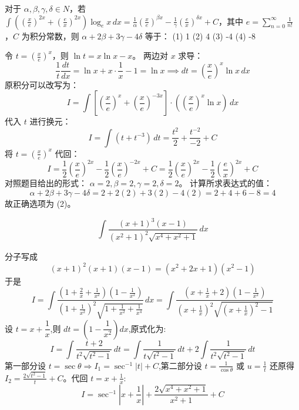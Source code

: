 \begin{questions}
    \question
对于 $\alpha, \beta, \gamma, \delta \in N$，若 $\int \left( \left(\frac{x}{e}\right)^{2x} + \left(\frac{e}{x}\right)^{2x} \right) \log_e x \,dx = \frac{1}{\alpha} \left(\frac{x}{e}\right)^{\beta x} - \frac{1}{\gamma} \left(\frac{e}{x}\right)^{\delta x} + C$，其中 $e = \sum_{n=0}^{\infty} \frac{1}{n!}$，$C$ 为积分常数，则 $\alpha + 2\beta + 3\gamma - 4\delta$ 等于：
(1) 1 \quad (2) 4 \quad (3) -4 \quad (4) -8

\begin{solution}
令 $t = \left(\frac{x}{e}\right)^x$，则 $\ln t = x \ln x - x$。
两边对 $x$ 求导：
\[
\frac{1}{t} \frac{dt}{dx} = \ln x + x \cdot \frac{1}{x} - 1 = \ln x \implies dt = \left(\frac{x}{e}\right)^x \ln x \,dx
\]
原积分可以改写为：
\[
I = \int \left[ \left(\frac{x}{e}\right)^x + \left(\frac{x}{e}\right)^{-3x} \right] \cdot \left( \left(\frac{x}{e}\right)^x \ln x \right) \,dx
\]
代入 $t$ 进行换元：
\[
I = \int (t + t^{-3}) \,dt = \frac{t^2}{2} + \frac{t^{-2}}{-2} + C
\]
将 $t = \left(\frac{x}{e}\right)^x$ 代回：
\[
I = \frac{1}{2} \left(\frac{x}{e}\right)^{2x} - \frac{1}{2} \left(\frac{x}{e}\right)^{-2x} + C = \frac{1}{2} \left(\frac{x}{e}\right)^{2x} - \frac{1}{2} \left(\frac{e}{x}\right)^{2x} + C
\]
对照题目给出的形式：
$\alpha = 2, \beta = 2, \gamma = 2, \delta = 2$。
计算所求表达式的值：
\[
\alpha + 2\beta + 3\gamma - 4\delta = 2 + 2(2) + 3(2) - 4(2) = 2 + 4 + 6 - 8 = 4
\]
故正确选项为 (2)。
\end{solution}
    \question
    \[
    \int \frac{(x+1)^3(x-1)}{(x^2+1)^2 \sqrt{x^4+x^2+1}} \, dx
    \]
    \begin{solution}
        分子写成
        \[
        (x+1)^2(x+1)(x-1) = (x^2+2x+1)(x^2-1)
        \]
        于是
        \[
        I = \int \frac{(1+\frac{2}{x}+\frac{1}{x^2})(1-\frac{1}{x^2})}{(1+\frac{1}{x^2})^2 \sqrt{1+\frac{1}{x^2}+\frac{1}{x^4}}} \, dx = \int \frac{(x+\frac{1}{x}+2)(1-\frac{1}{x^2})}{(x+\frac{1}{x})^2 \sqrt{(x+\frac{1}{x})^2-1}} 
        \]
        设 $t = x+\dfrac{1}{x}$,则 $dt = (1-\dfrac{1}{x^2})dx$,原式化为:
        \[
        I = \int \frac{t+2}{t^2\sqrt{t^2-1}} \, dt = \int \frac{1}{t\sqrt{t^2-1}} \, dt + 2 \int \frac{1}{t^2\sqrt{t^2-1}} \, dt
        \]
        第一部分设 $t=\sec \theta \Rightarrow I_1 = \sec^{-1}|t| + C$,第二部分设 $t=\frac{1}{\cos \theta}$ 或 $u=\frac{1}{t}$ 还原得 $I_2 = \frac{2\sqrt{t^2-1}}{t} + C$。代回 $t = x+\frac{1}{x}$:
        \[
        I = \sec^{-1}\left|x+\frac{1}{x}\right| + \frac{2\sqrt{x^4+x^2+1}}{x^2+1} + C
        \]
    \end{solution}


\end{questions}
